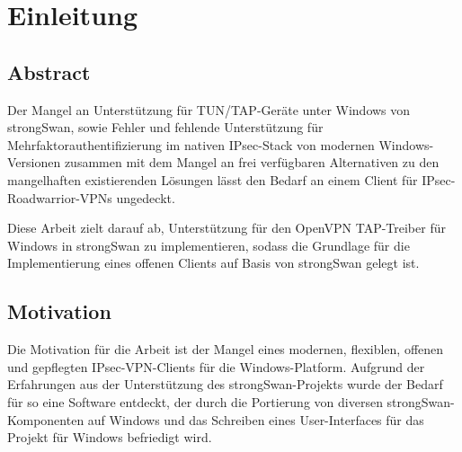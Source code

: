 


\chapter{Einleitung}
\section{Abstract}
Der Mangel an Unterstützung für TUN/TAP-Geräte unter Windows von strongSwan, sowie Fehler und
fehlende Unterstützung für Mehrfaktorauthentifizierung im nativen IPsec-Stack von modernen
Windows-Versionen zusammen mit dem Mangel an frei verfügbaren Alternativen zu den mangelhaften existierenden Lösungen
lässt den Bedarf an einem Client für IPsec-Roadwarrior-VPNs ungedeckt.

Diese Arbeit zielt darauf ab, Unterstützung für den OpenVPN TAP-Treiber
für Windows in strongSwan zu implementieren, sodass die Grundlage für die Implementierung
eines offenen Clients auf Basis von strongSwan gelegt ist.

\section{Motivation}
Die Motivation für die Arbeit ist der Mangel eines modernen, flexiblen, offenen
und  gepflegten IPsec-VPN-Clients für die Windows-Platform.
Aufgrund der Erfahrungen aus der Unterstützung des strongSwan-Projekts wurde
der Bedarf für so eine Software entdeckt, der durch die Portierung von diversen
strongSwan-Komponenten auf Windows und das Schreiben eines User-Interfaces
für das Projekt für Windows befriedigt wird.

\BlankPage
{}

